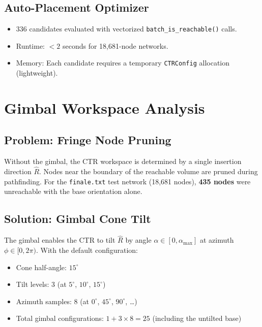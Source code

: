 \documentclass[11pt,a4paper]{article}
\newcommand{\funcname}[1]{\texttt{\textcolor{codepurple}{#1}}}
\begin{document}
\subsection{Auto-Placement Optimizer}

\begin{itemize}[nosep]
    \item 336 candidates evaluated with vectorized \funcname{batch\_is\_reachable()} calls.
    \item Runtime: $<2$ seconds for 18,681-node networks.
    \item Memory: Each candidate requires a temporary \texttt{CTRConfig} allocation (lightweight).
\end{itemize}

\section{Gimbal Workspace Analysis}
\label{sec:gimbal}

\subsection{Problem: Fringe Node Pruning}

Without the gimbal, the CTR workspace is determined by a single insertion direction $\hat{R}$. Nodes near the boundary of the reachable volume are pruned during pathfinding. For the \texttt{finale.txt} test network (18,681 nodes), \textbf{435 nodes} were unreachable with the base orientation alone.

\subsection{Solution: Gimbal Cone Tilt}

The gimbal enables the CTR to tilt $\hat{R}$ by angle $\alpha \in [0, \alpha_\text{max}]$ at azimuth $\phi \in [0, 2\pi)$. With the default configuration:
\begin{itemize}[nosep]
    \item Cone half-angle: $15^\circ$
    \item Tilt levels: 3 (at $5^\circ$, $10^\circ$, $15^\circ$)
    \item Azimuth samples: 8 (at $0^\circ$, $45^\circ$, $90^\circ$, \ldots)
    \item Total gimbal configurations: $1 + 3 \times 8 = 25$ (including the untilted base)
\end{itemize}
\end{document}
